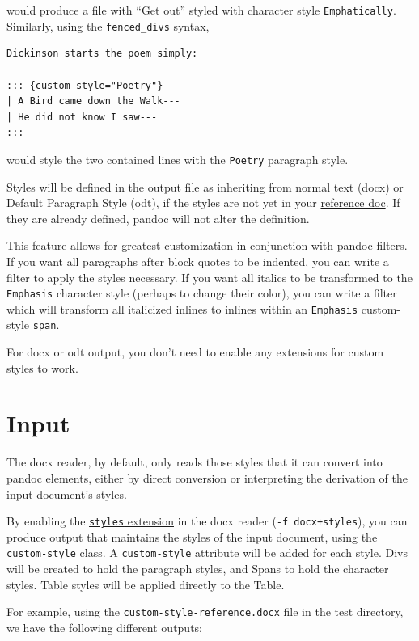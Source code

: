 \documentclass[
  b5paper
]{book}
\begin{document}
would produce a file with ``Get out'' styled with character style
\texttt{Emphatically}. Similarly, using the \texttt{fenced\_divs}
syntax,

\begin{verbatim}
Dickinson starts the poem simply:

::: {custom-style="Poetry"}
| A Bird came down the Walk---
| He did not know I saw---
:::
\end{verbatim}

would style the two contained lines with the \texttt{Poetry} paragraph
style.

Styles will be defined in the output file as inheriting from normal text
(docx) or Default Paragraph Style (odt), if the styles are not yet in
your \hyperref[option--reference-doc]{reference doc}. If they are
already defined, pandoc will not alter the definition.

This feature allows for greatest customization in conjunction with
\href{https://pandoc.org/filters.html}{pandoc filters}. If you want all
paragraphs after block quotes to be indented, you can write a filter to
apply the styles necessary. If you want all italics to be transformed to
the \texttt{Emphasis} character style (perhaps to change their color),
you can write a filter which will transform all italicized inlines to
inlines within an \texttt{Emphasis} custom-style \texttt{span}.

For docx or odt output, you don't need to enable any extensions for
custom styles to work.

\section{Input}\label{input}

The docx reader, by default, only reads those styles that it can convert
into pandoc elements, either by direct conversion or interpreting the
derivation of the input document's styles.

By enabling the \hyperref[ext-styles]{\texttt{styles} extension} in the
docx reader (\texttt{-f\ docx+styles}), you can produce output that
maintains the styles of the input document, using the
\texttt{custom-style} class. A \texttt{custom-style} attribute will be
added for each style. Divs will be created to hold the paragraph styles,
and Spans to hold the character styles. Table styles will be applied
directly to the Table.

For example, using the \texttt{custom-style-reference.docx} file in the
test directory, we have the following different outputs:
\end{document}
